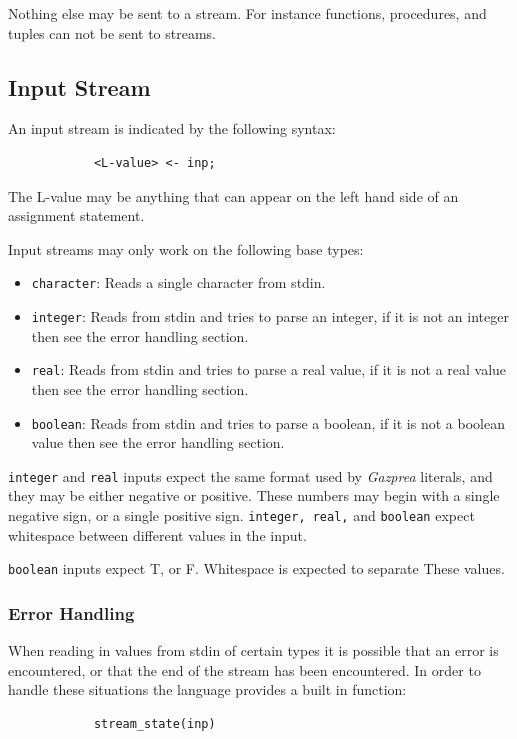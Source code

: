 \documentclass{article}
\begin{document}
		Nothing else may be sent to a stream. For instance functions, procedures, and tuples can not be sent to streams.


	\subsection{Input Stream}
		An input stream is indicated by the following syntax:

		\begin{lstlisting}
			<L-value> <- inp;
		\end{lstlisting}

		The L-value may be anything that can appear on the left hand side of an assignment statement.

		Input streams may only work on the following base types:
		\begin{itemize}
			\item \texttt{character}: Reads a single character from stdin.
			\item \texttt{integer}: Reads from stdin and tries to parse an integer, if it is not an integer then see the
			error handling section.
			\item \texttt{real}: Reads from stdin and tries to parse a real value, if it is not a real value then see
			the error handling section.
			\item \texttt{boolean}: Reads from stdin and tries to parse a boolean, if it is
			not a boolean value then see the error handling section.
		\end{itemize}

		\texttt{integer} and \texttt{real} inputs expect the same format used by \textit{Gazprea} literals, and they may
		be either negative or positive. These numbers may begin with a single negative sign, or a single positive sign.
		\texttt{integer, real,} and \texttt{boolean} expect whitespace between different values in the input.

		\texttt{boolean} inputs expect T, or F. Whitespace is expected to separate These values.


	\subsubsection{Error Handling}
		When reading in values from stdin of certain types it is possible that an error is encountered, or that the end
		of the stream has been encountered. In order to handle these situations the language provides a built in
		function:

		\begin{lstlisting}
			stream_state(inp)
		\end{lstlisting}
\end{document}
